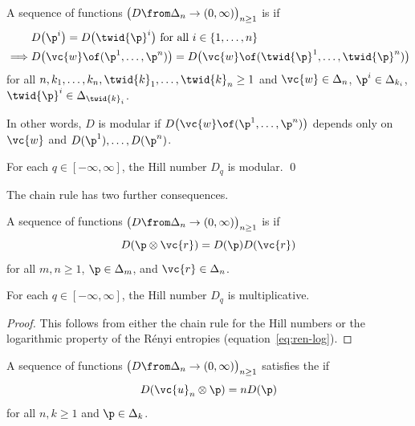 \begin{defn}
A sequence of functions $\bigl(D \from \Delta_n \to (0, \infty) \bigr)_{n
  \geq 1}$ is %
%
%
if 
% 
\begin{align*}
&
D\bigl(\p^i\bigr) = D\bigl(\twid{\p}^i\bigr) 
\text{ for all } i \in \{1, \ldots, n\}     \\
\implies
&
D\bigl( \vc{w} \of (\p^1, \ldots, \p^n) \bigr) =
D\bigl( \vc{w} \of (\twid{\p}^1, \ldots, \twid{\p}^n) \bigr) 
\end{align*}
% 
for all $n, k_1, \ldots, k_n, \twid{k}_1, \ldots, \twid{k}_n \geq 1$ and
$\vc{w} \in \Delta_n$, $\p^i \in \Delta_{k_i}$, $\twid{\p}^i \in
\Delta_{\twid{k}_i}$.  
\end{defn}

In other words, $D$ is modular if $D\bigl( \vc{w} \of (\p^1, \ldots, \p^n)
\bigr)$ depends only on $\vc{w}$ and $D(\p^1), \ldots, D(\p^n)$. 

\begin{cor}[Modularity]
%
% 
For each $q \in [-\infty, \infty]$, the Hill number $D_q$ is modular.
\qed
\end{cor}

The chain rule has two further consequences.

\begin{defn}
A sequence of functions $\bigl( D \from \Delta_n \to (0, \infty) \bigr)_{n
  \geq 1}$ is %
%
% 
if 
\[
D(\p \otimes \vc{r}) = D(\p) D(\vc{r})
\]
for all $m, n \geq 1$, $\p \in \Delta_m$, and $\vc{r} \in \Delta_n$. 
\end{defn}

\begin{cor}[Multiplicativity]
%
% 
For each $q \in [-\infty, \infty]$, the Hill number $D_q$ is
multiplicative. 
\end{cor}

\begin{proof}
This follows from either 
the chain rule for the Hill numbers
or the logarithmic property of the
R\'enyi entropies (equation~\eqref{eq:ren-log}).
\end{proof}

\begin{defn}
A sequence of functions $\bigl( D \from \Delta_n \to (0, \infty) \bigr)_{n
  \geq 1}$ satisfies the 
 if 
\[
D(\vc{u}_n \otimes \p) = nD(\p)
\]
for all $n, k \geq 1$ and $\p \in \Delta_k$.
\end{defn}

